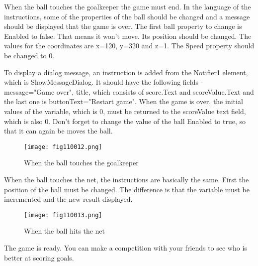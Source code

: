 When the ball touches the goalkeeper the game must end. In the language of the instructions, some of the properties of the ball should be changed and a message should be displayed that the game is over. The first ball property to change is Enabled to false. That means it won't move. Its position should be changed. The values for the coordinates are x=120, y=320 and z=1. The Speed property should be changed to 0.

To display a dialog message, an instruction is added from the Notifier1 element, which is ShowMessageDialog. It should have the following fields - message="Game over", title, which consists of score.Text and scoreValue.Text and the last one is buttonText="Restart game". When the game is over, the initial values of the variable, which is 0, must be returned to the scoreValue text field, which is also 0. Don't forget to change the value of the ball Enabled to true, so that it can again be moves the ball.

\begin{figure}[H]
   \centering
   \texttt{[image: fig110012.png]}
   \caption{When the ball touches the goalkeeper}
\label{fig110012}
\end{figure}

When the ball touches the net, the instructions are basically the same. First the position of the ball must be changed. The difference is that the variable must be incremented and the new result displayed.

\begin{figure}[H]
   \centering
   \texttt{[image: fig110013.png]}
   \caption{When the ball hits the net}
\label{fig110013}
\end{figure}

The game is ready. You can make a competition with your friends to see who is better at scoring goals.
